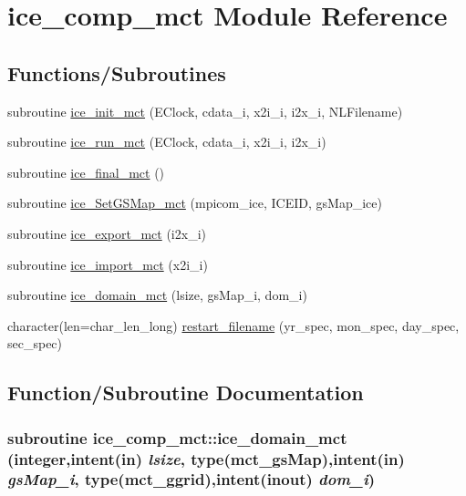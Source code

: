\hypertarget{namespaceice__comp__mct}{
\section{ice\_\-comp\_\-mct Module Reference}
\label{namespaceice__comp__mct}
}
\subsection*{Functions/Subroutines}
\begin{DoxyCompactItemize}
\item 
subroutine \hyperlink{namespaceice__comp__mct_aea0306f80417faf23e2153503a468ed0}{ice\_\-init\_\-mct} (EClock, cdata\_\-i, x2i\_\-i, i2x\_\-i, NLFilename)
\item 
subroutine \hyperlink{namespaceice__comp__mct_a7e9300fd6b2392c92d54b05f84464939}{ice\_\-run\_\-mct} (EClock, cdata\_\-i, x2i\_\-i, i2x\_\-i)
\item 
subroutine \hyperlink{namespaceice__comp__mct_acd10abc7ef002e1d5e3223ce079bad2b}{ice\_\-final\_\-mct} ()
\item 
subroutine \hyperlink{namespaceice__comp__mct_a44b387bdc97aa66b1bd25afd2b68ec09}{ice\_\-SetGSMap\_\-mct} (mpicom\_\-ice, ICEID, gsMap\_\-ice)
\item 
subroutine \hyperlink{namespaceice__comp__mct_a0b623ba08317afe1cf24e68494b092da}{ice\_\-export\_\-mct} (i2x\_\-i)
\item 
subroutine \hyperlink{namespaceice__comp__mct_a64a861144b6d897f984676031622b7f9}{ice\_\-import\_\-mct} (x2i\_\-i)
\item 
subroutine \hyperlink{namespaceice__comp__mct_a13b99c3351533da77b875c4de8cf6cf8}{ice\_\-domain\_\-mct} (lsize, gsMap\_\-i, dom\_\-i)
\item 
character(len=char\_\-len\_\-long) \hyperlink{namespaceice__comp__mct_a06dea082678c790cef2bcb75c338b6d2}{restart\_\-filename} (yr\_\-spec, mon\_\-spec, day\_\-spec, sec\_\-spec)
\end{DoxyCompactItemize}


\subsection{Function/Subroutine Documentation}
\hypertarget{namespaceice__comp__mct_a13b99c3351533da77b875c4de8cf6cf8}{
\subsubsection[{ice\_\-domain\_\-mct}]{\setlength{\rightskip}{0pt plus 5cm}subroutine ice\_\-comp\_\-mct::ice\_\-domain\_\-mct (integer,intent(in) {\em lsize}, \/  type(mct\_\-gsMap),intent(in) {\em gsMap\_\-i}, \/  type(mct\_\-ggrid),intent(inout) {\em dom\_\-i})}}
\label{namespaceice__comp__mct_a13b99c3351533da77b875c4de8cf6cf8}


